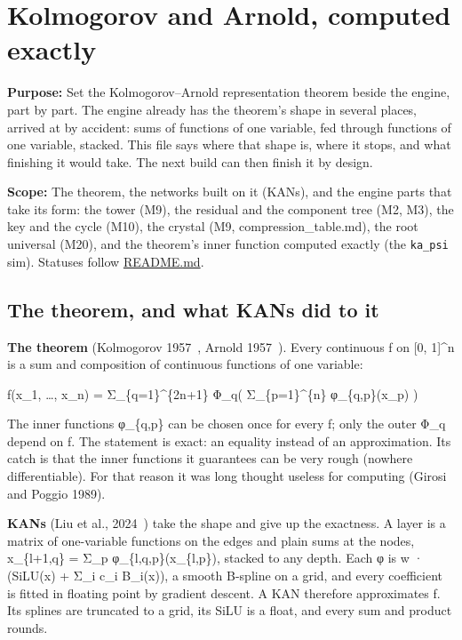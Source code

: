 \chapter{\texorpdfstring{Kolmogorov and Arnold, computed exactly}{Kolmogorov and Arnold, computed exactly}}
\label{chap:kolmogorov-arnold}

\textbf{Purpose:} Set the Kolmogorov–Arnold representation theorem beside the engine, part by part. The engine already has the theorem's shape in several places, arrived at by accident: sums of functions of one variable, fed through functions of one variable, stacked. This file says where that shape is, where it stops, and what finishing it would take. The next build can then finish it by design.

\textbf{Scope:} The theorem, the networks built on it (KANs), and the engine parts that take its form: the tower (M9), the residual and the component tree (M2, M3), the key and the cycle (M10), the crystal (M9, compression\_\allowbreak{}table.md), the root universal (M20), and the theorem's inner function computed exactly (the \texttt{ka\_\allowbreak{}psi} sim). Statuses follow \hyperref[chap:readme]{README.md}.

\section{\texorpdfstring{The theorem, and what KANs did to it}{The theorem, and what KANs did to it}}

\textbf{The theorem} (Kolmogorov 1957~\cite{src:Kolmogorov-1957}, Arnold 1957~\cite{src:Arnold-1957}). Every continuous f on [0, 1]\textasciicircum{}n is a sum and composition of continuous functions of one variable:

f(x\_\allowbreak{}1, …, x\_\allowbreak{}n) = Σ\_\allowbreak{}\{q=1\}\textasciicircum{}\{2n+1\} Φ\_\allowbreak{}q( Σ\_\allowbreak{}\{p=1\}\textasciicircum{}\{n\} φ\_\allowbreak{}\{q,p\}(x\_\allowbreak{}p) )

The inner functions φ\_\allowbreak{}\{q,p\} can be chosen once for every f; only the outer Φ\_\allowbreak{}q depend on f. The statement is exact: an equality instead of an approximation. Its catch is that the inner functions it guarantees can be very rough (nowhere differentiable). For that reason it was long thought useless for computing (Girosi and Poggio 1989).

\textbf{KANs} (Liu et al., 2024~\cite{src:Liu-et-al-2024}) take the shape and give up the exactness. A layer is a matrix of one-variable functions on the edges and plain sums at the nodes, x\_\allowbreak{}\{l+1,q\} = Σ\_\allowbreak{}p φ\_\allowbreak{}\{l,q,p\}(x\_\allowbreak{}\{l,p\}), stacked to any depth. Each φ is w · (SiLU(x) + Σ\_\allowbreak{}i c\_\allowbreak{}i B\_\allowbreak{}i(x)), a smooth B-spline on a grid, and every coefficient is fitted in floating point by gradient descent. A KAN therefore approximates f. Its splines are truncated to a grid, its SiLU is a float, and every sum and product rounds.

